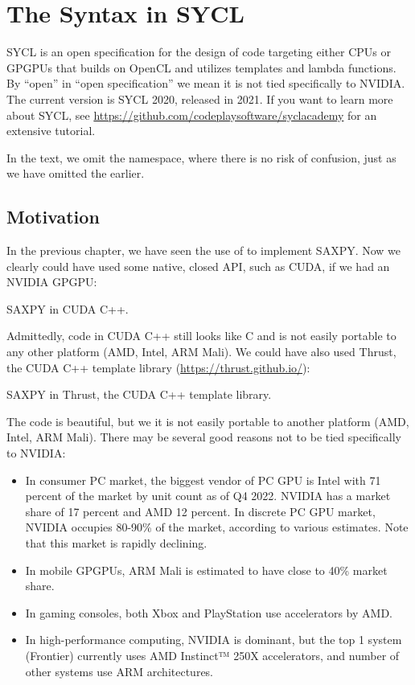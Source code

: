 \chapter{The Syntax in SYCL}

SYCL is an open specification for the design of code targeting either CPUs or GPGPUs 
that builds on OpenCL and utilizes templates and lambda functions.
By ``open'' in ``open specification'' we mean it is not tied specifically to NVIDIA. 
The current version is SYCL 2020, released in 2021. 
If you want to learn more about SYCL, see 
\url{https://github.com/codeplaysoftware/syclacademy} for an extensive tutorial.

In the text, we omit the  namespace, where there is no risk of confusion, just as we have omitted the  earlier. 

\section{Motivation}

In the previous chapter, we have seen the use of  to implement SAXPY. Now we clearly could have used some native, closed API, such as CUDA, if we had an NVIDIA GPGPU:

\raggedbottom
\begin{codebox}[]{}
\footnotesize SAXPY in CUDA C++.
\tcblower
{}
\end{codebox}

Admittedly, code in CUDA C++ still looks like C and is not easily portable to any other platform (AMD, Intel, ARM Mali). We could have also used Thrust, the CUDA C++ template library (\url{https://thrust.github.io/}): 

\raggedbottom
\begin{codebox}[]{}
\footnotesize SAXPY in Thrust, the CUDA C++ template library.
\tcblower
{}
\end{codebox}

The code is beautiful, but we it is not easily portable to another platform (AMD, Intel, ARM Mali). There may be several good reasons not to be tied specifically to NVIDIA:
\begin{itemize}
\item In consumer PC market, the biggest vendor of PC GPU is Intel with 71 percent of the market by unit count as of Q4 2022. NVIDIA has a market share of 17 percent and AMD 12 percent. In discrete PC GPU market, NVIDIA occupies 80-90\% of the market, according to various estimates. 
Note that this market is rapidly declining.
\item In mobile GPGPUs, ARM Mali is estimated to have close to 40\% market share.  
\item In gaming consoles, both Xbox and PlayStation use accelerators by AMD. 
\item In high-performance computing, NVIDIA is dominant, but the top 1 system (Frontier) currently uses AMD Instinct™ 250X accelerators, and number of other systems use ARM architectures. 
\end{itemize}

